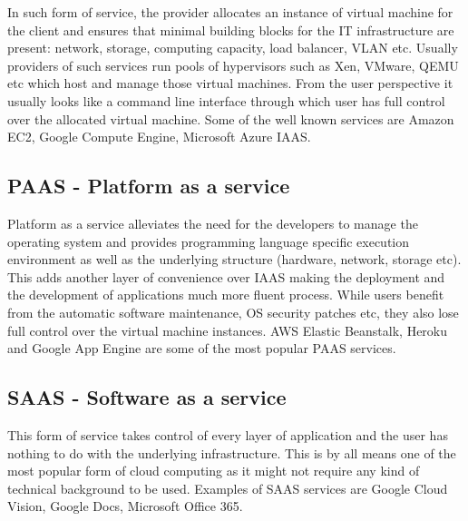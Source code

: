\documentclass[licencjacka,en]{thesisclass}
\begin{document}
In such form of service, the provider allocates an instance of virtual machine for the client 
and ensures that minimal building blocks for the IT infrastructure are present: network, storage, computing capacity, load balancer, VLAN  etc. Usually providers of such services run pools of hypervisors such as Xen, VMware, QEMU etc which host and manage those virtual machines. From the user perspective it usually looks like a command line interface through which user has full control over the allocated virtual machine. Some of the well known services are Amazon EC2, Google Compute Engine, Microsoft Azure IAAS.

\subsection{PAAS - Platform as a service}

Platform as a service alleviates the need for the developers to manage the operating system and provides programming language specific execution environment as well as the underlying structure (hardware, network, storage etc). This adds another layer of convenience over IAAS making the deployment and the development of applications much more fluent process. While users benefit from the automatic software maintenance, OS security patches etc, they also lose full control over the virtual machine instances. AWS Elastic Beanstalk, Heroku and Google App Engine are some of the most popular PAAS services.

\subsection{SAAS - Software as a service}

This form of service takes control of every layer of application and the user has nothing to do with the underlying infrastructure. This is by all means one of the most popular form of cloud computing as it might not require any kind of technical background to be used. Examples of SAAS services are Google Cloud Vision, Google Docs, Microsoft Office 365. 

\begin{thebibliography}{99}


\end{thebibliography}
\end{document}
